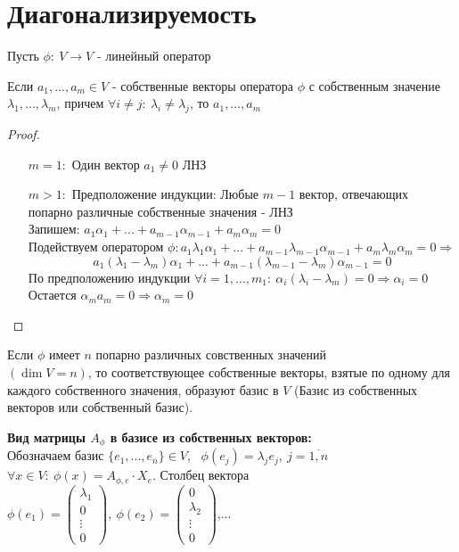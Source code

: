 \section{Диагонализируемость}
    Пусть $\phi: \ V \to V$ - линейный оператор
    \begin{lemma}
        Если $a_1,...,a_m \in V$ - собственные векторы оператора $\phi$ с собственным значение $\lambda_1,...,\lambda_m$, причем $\forall i \neq j: \ \lambda_i \neq \lambda_j$, то $a_1,...,a_m$     
    \end{lemma}
    \begin{proof} \tab
        \begin{itemize}
            \item[$m=1:$] Один вектор $a_1 \neq 0$ ЛНЗ
            \item[$m>1:$]  Предположение индукции: Любые $m-1$ вектор, отвечающих попарно различные собственные значения - ЛНЗ\\
            Запишем: $a_1\alpha_1 + ... + a_{m-1}\alpha_{m-1} + a_m \alpha_m = 0$ \\
            Подействуем оператором $\phi: a_1 \lambda_1\alpha_1 + ... + a_{m-1} \lambda_{m-1}\alpha_{m-1} + a_m  \lambda_m\alpha_m = 0 \Longrightarrow$
            $$a_1 (\lambda_1 - \lambda_m)\alpha_1 + ... + a_{m-1} (\lambda_{m-1} - \lambda_m)\alpha_{m-1} = 0$$ 
            По предположению индукции $\forall i = 1,...,m_1: \ \alpha_i(\lambda_i - \lambda_m)= 0 \Longrightarrow \alpha_i = 0$\\
            Остается $\alpha_ma_m = 0 \Longrightarrow \alpha_m = 0$ 
        \end{itemize}
    \end{proof}
    \begin{consequense}
        Если $\phi$ имеет $n$ попарно различных совственных значений\\ $(\dim V = n)$, то соответствующее собственные векторы, взятые по одному для каждого собственного значения, образуют базис в $V$ (Базис из собственных векторов или собственный базис).
    \end{consequense}
    \textbf{Вид матрицы $A_\phi$ в базисе из собственных векторов:}\\
    Обозначаем базис $\{e_1,...,e_n\} \in V$, \ $\phi(e_j) = \lambda_j e_j, \ j = \overline{1,n}$  \\
    $\forall x \in V: \ \phi(x) = A_{\phi,e}\cdot X_e$. Столбец вектора $\phi(e_1) = \left(\begin{smallmatrix}
        \lambda_1 \\ 0 \\ \vdots \\ 0
    \end{smallmatrix}\right), \ \phi(e_2) = \left(\begin{smallmatrix}
        0 \\ \lambda_2 \\ \vdots \\ 0
    \end{smallmatrix}\right)$,...
